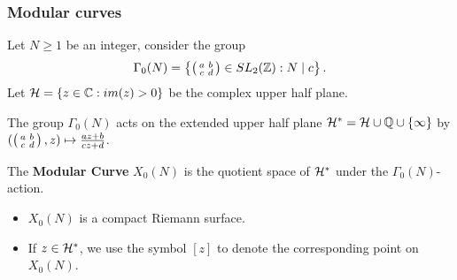 \documentclass[handout]{beamer}
\begin{document}
\begin{frame}
\frametitle{Modular curves}
Let $N \geq 1$ be an integer, consider the group 
\[
	\Gamma_0(N) = \left \{ \left( \begin{smallmatrix}a&b\\c&d\end{smallmatrix}\right) \in SL_2(\mathbb{Z}): N \mid c \right\}.
\]
Let $\mathcal{H} = \{z \in \mathbb{C}: im(z) > 0\}$ be the complex upper half plane. \\

\smallskip 
\pause

The group $\Gamma_0(N)$ acts on the extended upper half plane $\mathcal{H}^{*} = \mathcal{H} \cup \mathbb{Q} \cup \{\infty\}$
by $(\left( \begin{smallmatrix}a&b\\c&d\end{smallmatrix}\right) , z) \mapsto \frac{az+b}{cz+d}$.

\pause
\begin{Def}
The {\bf Modular Curve} $X_0(N)$ is the quotient space
of $\mathcal{H}^*$ under the $\Gamma_0(N)$-action.
\end{Def}

\pause

\begin{itemize}
\item $X_0(N)$ is a compact Riemann surface. %
\item If $z \in \mathcal{H}^*$, we use the symbol $[z]$ to denote the corresponding point on $X_0(N)$.
\end{itemize}



\end{frame}




\end{document}
